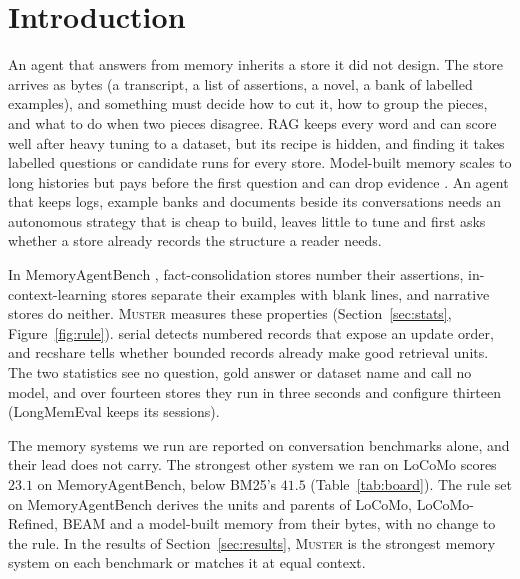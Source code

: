 \documentclass{article}
\newcommand{\sys}{\textsc{Muster}}
\newcommand{\serial}{\textsf{serial}}
\newcommand{\cov}{\textsf{recshare}}
\begin{document}
\section{Introduction}

An agent that answers from memory inherits a store it did not design. The store arrives as bytes (a
transcript, a list of assertions, a novel, a bank of labelled examples), and something must decide how to cut
it, how to group the pieces, and what to do when two pieces disagree. RAG keeps every word and can score well after heavy tuning to a dataset, but its recipe is hidden, and finding it takes labelled questions or candidate runs for every store. Model-built memory scales to long histories but pays before the first question and can drop evidence \cite{fidelity}. An agent that keeps logs, example banks and documents beside its conversations needs an autonomous strategy that is cheap to build, leaves little to tune and first asks whether a store already records the structure a reader needs.

In MemoryAgentBench \cite{mab}, fact-consolidation stores number their assertions,
in-context-learning stores separate their examples with blank lines, and narrative stores do neither. \sys{}
measures these properties (Section~\ref{sec:stats}, Figure~\ref{fig:rule}). \serial{} detects numbered records that
expose an update order, and \cov{} tells whether bounded records already make good retrieval units. The
two statistics see no question, gold answer or dataset name and call no model, and over fourteen stores they run
in three seconds and configure thirteen (LongMemEval keeps its sessions).

The memory systems we run are reported on conversation benchmarks alone, and their lead does not carry. The strongest other system we ran on LoCoMo scores $23.1$ on MemoryAgentBench, below BM25's $41.5$ (Table~\ref{tab:board}). The rule set on MemoryAgentBench derives the units and parents of LoCoMo, LoCoMo-Refined, BEAM and a model-built memory from their bytes, with no change to the rule. In the results of Section~\ref{sec:results}, \sys{} is the strongest memory system on each benchmark or matches it at equal context.
\end{document}
